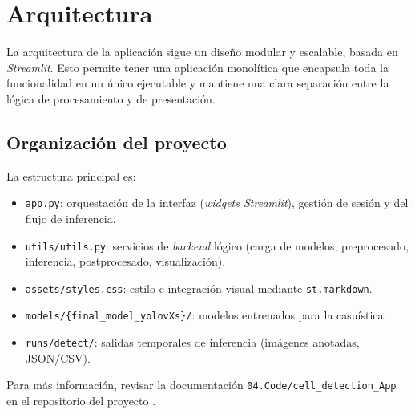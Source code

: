 \documentclass[12pt,a4paper,onecolumn,oneside]{report}
\begin{document}
\section{Arquitectura}
\label{sec:Arquitectura}
La arquitectura de la aplicación sigue un diseño modular y escalable, basada en \textit{Streamlit}. Esto permite tener una aplicación monolítica que encapsula toda la funcionalidad en un único ejecutable y mantiene 
una clara separación entre la lógica de procesamiento y de presentación.

\subsection{Organización del proyecto}
La estructura principal es:
\begin{itemize}
  \item \texttt{app.py}: orquestación de la interfaz (\textit{widgets Streamlit}), gestión de sesión y del flujo de inferencia.
  \item \texttt{utils/utils.py}: servicios de \textit{backend} lógico (carga de modelos, preprocesado, inferencia, postprocesado, visualización).
  \item \texttt{assets/styles.css}: estilo e integración visual mediante \texttt{st.markdown}.
  \item \texttt{models/\{final\_model\_yolovXs\}/}: modelos entrenados para la casuística.
  \item \texttt{runs/detect/}: salidas temporales de inferencia (imágenes anotadas, JSON/CSV).
\end{itemize}

Para más información, revisar la documentación \texttt{04.Code/cell\_detection\_App} en el repositorio del proyecto \cite{repoTFM}.
\end{document}
